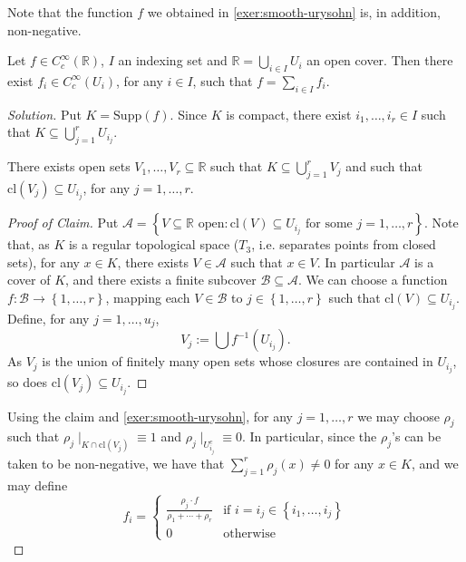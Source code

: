 \documentclass[12pt, draft,reqno,a4paper, twoside]{amsproc}
\newcommand{\supp}{\mathrm{Supp}}
\newcommand{\cl}[1]{\mathrm{cl}\left(#1\right)}
\newcommand{\dbR}{\mathbb R}
\newcommand{\set}[1]{\left\{{#1}\right\}}
\newcommand{\mcal}{\mathcal}
\begin{document}
\begin{rem}Note that the function $f$ we obtained in \autoref{exer:smooth-urysohn} is, in addition, non-negative.
\end{rem}
\begin{exer} Let $f\in C_c^\infty(\dbR)$, $I$ an indexing set and $\dbR=\bigcup_{i\in I}U_i$ an open cover. Then there exist $f_i\in C_c^\infty(U_i)$, for any $i\in I$, such that $f=\sum_{i\in I}f_i$. 
\end{exer}
\begin{proof}[\it Solution] Put $K=\supp (f)$. Since $K$ is compact, there exist $i_1,\ldots,i_r\in I$ such that $K\subseteq \bigcup_{j=1}^r U_{i_j}$. 
\begin{claim}There exists open sets $V_1,\ldots,V_r\subseteq \dbR$ such that $K\subseteq \bigcup_{j=1}^r V_j$ and such that $\cl{V_j}\subseteq U_{i_j}$, for any $j=1,\ldots,r$. 
\end{claim}
\begin{proof}[\it Proof of Claim]\renewcommand{\qedsymbol}{}Put $\mcal{A}=\set{V\subseteq \dbR\text{ open}:\cl{V}\subseteq U_{i_j}\text{ for some }j=1,\ldots,r}$. Note that, as $K$ is a regular topological space ($T_3$, i.e. separates points from closed sets), for any $x\in K$, there exists $V\in\mcal{A}$ such that $x\in V$. In particular $\mcal{A}$ is a cover of $K$, and there exists a finite subcover $\mcal{B}\subseteq\mcal{A}$. We can choose a function $f:\mcal{B}\to \set{1,\ldots,r}$, mapping each $V\in \mcal{B}$ to $j\in \set{1,\ldots,r}$ such that $\cl{V}\subseteq U_{i_j}$. Define, for any $j=1,\ldots,u_j$,
\[V_j:=\bigcup f^{-1}(U_{i_j}).\]
As $V_j$ is the union of finitely many open sets whose closures are contained in $U_{i_j}$, so does $\cl{V_j}\subseteq U_{i_j}$. 
\end{proof}
Using the claim and \autoref{exer:smooth-urysohn}, for any $j=1,\ldots,r$ we may choose $\rho_j$ such that $\rho_j\mid_{K\cap \cl{V_j}}\equiv 1$ and $\rho_j\mid_{U_{i_j}^c}\equiv 0$. In particular, since the $\rho_j$'s can be taken to be non-negative, we have that $\sum_{j=1}^r \rho_j(x)\ne 0$ for any $x\in K$, and we may define 
\[f_i=\begin{cases}\frac{\rho_j\cdot f}{\rho_1+\cdots+\rho_r}&\text{if }i=i_j\in\set{i_1,\ldots,i_j}\\
0&\text{otherwise}
\end{cases}
\]
\end{proof}
\end{document}
